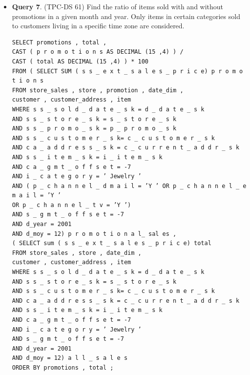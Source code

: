 \documentclass[12pt]{book}
\begin{document}
\begin{itemize}
\item \textbf{Query 7}. (TPC-DS 61) Find the ratio of items sold with and without promotions in a given month and year. Only items in certain 
categories sold to customers living in a specific time zone are considered.
\begin{lstlisting}[frame=single]
SELECT promotions , total ,
CAST ( p r o m o t i o n s AS DECIMAL (15 ,4) ) /
CAST ( total AS DECIMAL (15 ,4) ) * 100
FROM ( SELECT SUM ( s s _ e x t _ s a l e s _ p r i c e) p r o m o t i o n s
FROM store_sales , store , promotion , date_dim ,
customer , customer_address , item
WHERE s s _ s o l d _ d a t e _ s k = d _ d a t e _ s k
AND s s _ s t o r e _ s k = s _ s t o r e _ s k
AND s s _ p r o m o _ s k = p _ p r o m o _ s k
AND s s _ c u s t o m e r _ s k= c _ c u s t o m e r _ s k
AND c a _ a d d r e s s _ s k = c _ c u r r e n t _ a d d r _ s k
AND s s _ i t e m _ s k = i _ i t e m _ s k
AND c a _ g m t _ o f f s e t = -7
AND i _ c a t e g o r y = ’ Jewelry ’
AND ( p _ c h a n n e l _ d m a i l = ’Y ’ OR p _ c h a n n e l _ e m a i l = ’Y ’
OR p _ c h a n n e l _ t v = ’Y ’)
AND s _ g m t _ o f f s e t = -7
AND d_year = 2001
AND d_moy = 12) p r o m o t i o n a l_ sal es ,
( SELECT sum ( s s _ e x t _ s a l e s _ p r i c e) total
FROM store_sales , store , date_dim ,
customer , customer_address , item
WHERE s s _ s o l d _ d a t e _ s k = d _ d a t e _ s k
AND s s _ s t o r e _ s k = s _ s t o r e _ s k
AND s s _ c u s t o m e r _ s k= c _ c u s t o m e r _ s k
AND c a _ a d d r e s s _ s k = c _ c u r r e n t _ a d d r _ s k
AND s s _ i t e m _ s k = i _ i t e m _ s k
AND c a _ g m t _ o f f s e t = -7
AND i _ c a t e g o r y = ’ Jewelry ’
AND s _ g m t _ o f f s e t = -7
AND d_year = 2001
AND d_moy = 12) a l l _ s a l e s
ORDER BY promotions , total ;
\end{lstlisting}


\end{itemize}
\end{document}
